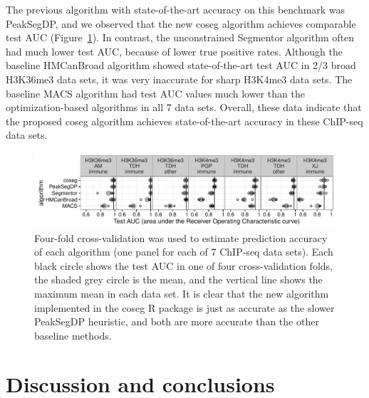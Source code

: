 \documentclass{article}
\begin{document}
The previous algorithm with state-of-the-art accuracy on this
benchmark was PeakSegDP, and we observed that the new coseg algorithm
achieves comparable test AUC (Figure~\ref{fig:test-error-dots}). In
contrast, the unconstrained Segmentor algorithm often had much lower
test AUC, because of lower true positive rates. Although the baseline
HMCanBroad algorithm showed state-of-the-art test AUC in 2/3 broad
H3K36me3 data sets, it was very inaccurate for sharp H3K4me3 data
sets. The baseline MACS algorithm had test AUC values much lower than
the optimization-based algorithms in all 7 data sets. Overall, these
data indicate that the proposed coseg algorithm achieves
state-of-the-art accuracy in these ChIP-seq data sets.

\begin{figure}[b!]
  \centering
  \includegraphics[width=\textwidth]{figure-test-error-dots}
  \vskip -0.5cm
  \caption{Four-fold cross-validation was used to estimate prediction
    accuracy of each algorithm (one panel for each of 7 ChIP-seq data sets). 
Each black circle shows the test AUC in one of four
    cross-validation folds, the shaded grey circle is the mean, and
    the vertical line shows the maximum mean in each data set. It is
    clear that the new algorithm implemented in the coseg R package is
    just as accurate as the slower PeakSegDP heuristic, and both are
    more accurate than the other baseline methods. 
  }
  \label{fig:test-error-dots}
\end{figure}

%   

\section{Discussion and conclusions}



\end{document}
